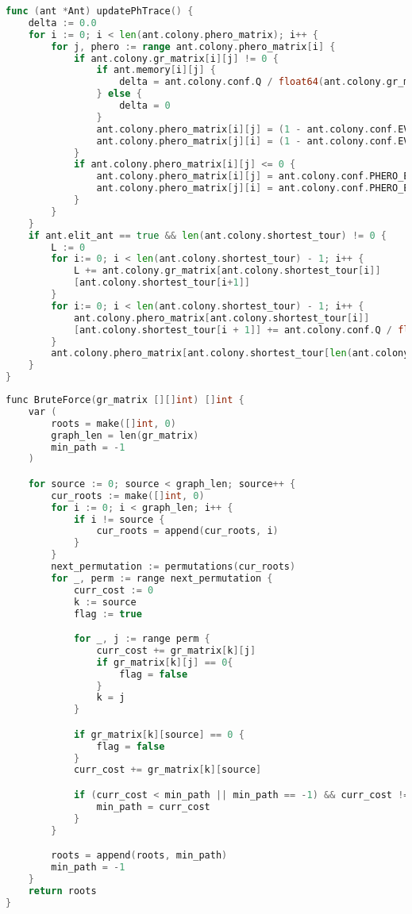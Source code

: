 \begin{lstlisting}[language=Go, label=lst:alg:Parallel5, caption=Реализация функции обновления феромона]
func (ant *Ant) updatePhTrace() {
    delta := 0.0
    for i := 0; i < len(ant.colony.phero_matrix); i++ {
        for j, phero := range ant.colony.phero_matrix[i] {
            if ant.colony.gr_matrix[i][j] != 0 {
                if ant.memory[i][j] {
                    delta = ant.colony.conf.Q / float64(ant.colony.gr_matrix[i][j])
                } else {
                    delta = 0
                }
                ant.colony.phero_matrix[i][j] = (1 - ant.colony.conf.EVAP_RATE) * (float64(phero) + delta)
                ant.colony.phero_matrix[j][i] = (1 - ant.colony.conf.EVAP_RATE) * (float64(phero) + delta)
            }
            if ant.colony.phero_matrix[i][j] <= 0 {
                ant.colony.phero_matrix[i][j] = ant.colony.conf.PHERO_EPS
                ant.colony.phero_matrix[j][i] = ant.colony.conf.PHERO_EPS
            }
        }
    }
    if ant.elit_ant == true && len(ant.colony.shortest_tour) != 0 {
        L := 0
        for i:= 0; i < len(ant.colony.shortest_tour) - 1; i++ {
            L += ant.colony.gr_matrix[ant.colony.shortest_tour[i]]
            [ant.colony.shortest_tour[i+1]]
        }
        for i:= 0; i < len(ant.colony.shortest_tour) - 1; i++ {
            ant.colony.phero_matrix[ant.colony.shortest_tour[i]]
            [ant.colony.shortest_tour[i + 1]] += ant.colony.conf.Q / float64(L)
        }
        ant.colony.phero_matrix[ant.colony.shortest_tour[len(ant.colony.shortest_tour) - 1]][ant.colony.shortest_tour[0]] += ant.colony.conf.Q / float64(L)
    }
}
\end{lstlisting}

\begin{lstlisting}[language=C++, label=lst:alg:Sync, caption=Реализация алгоритма полного перебора]
func BruteForce(gr_matrix [][]int) []int {
    var (
        roots = make([]int, 0)
        graph_len = len(gr_matrix)
        min_path = -1
    )

    for source := 0; source < graph_len; source++ {
        cur_roots := make([]int, 0)
        for i := 0; i < graph_len; i++ {
            if i != source {
                cur_roots = append(cur_roots, i)
            }
        } 
        next_permutation := permutations(cur_roots)
        for _, perm := range next_permutation {
            curr_cost := 0
            k := source
            flag := true

            for _, j := range perm {
                curr_cost += gr_matrix[k][j]
                if gr_matrix[k][j] == 0{
                    flag = false
                }
                k = j
            }

            if gr_matrix[k][source] == 0 {
                flag = false
            }
            curr_cost += gr_matrix[k][source]

            if (curr_cost < min_path || min_path == -1) && curr_cost != 0 && flag == true{
                min_path = curr_cost
            }
        }

        roots = append(roots, min_path)
        min_path = -1
    }
    return roots
}
\end{lstlisting}
\par \text{  }


